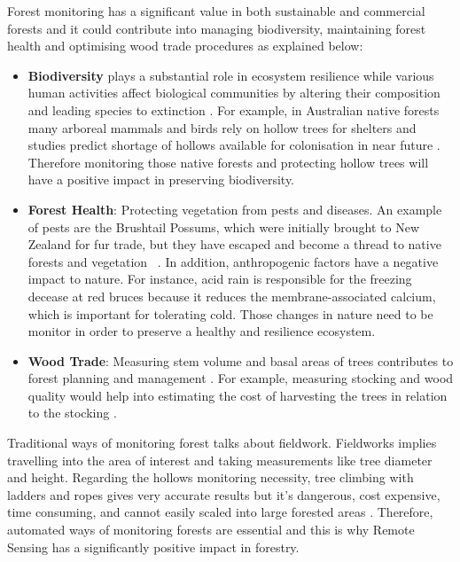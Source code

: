 \documentclass{subfiles}
\begin{document}
Forest monitoring has a significant value in both sustainable and commercial forests and it could contribute into managing biodiversity, maintaining forest health and optimising wood trade procedures as explained below: 
\begin{itemize}
 \item \textbf{Biodiversity} plays a substantial role in ecosystem resilience \cite{Elmqvist2003} while various human activities affect biological communities by altering their composition and leading species to extinction \cite{Hooper2005}.  For example, in Australian native forests many arboreal mammals and birds rely on hollow trees for shelters \cite{Lindenmayer2010} and studies predict shortage of hollows available for colonisation in near future \cite{Goldingay2009}\cite{Gibbons2002}. Therefore monitoring those native forests and protecting hollow trees will have a positive impact in preserving biodiversity.
 \item \textbf{Forest Health}: Protecting vegetation from pests and diseases. An example of pests are the Brushtail Possums, which were initially brought to New Zealand for fur trade, but they have escaped and become a thread to native forests and vegetation ~\cite{DepartementOfConversation2014}. In addition, anthropogenic factors have a negative impact to nature. For instance, acid rain is responsible for the freezing decease at red bruces because it reduces the membrane-associated calcium, which is important for tolerating cold\cite{DeHayes1999}. Those changes in nature need to be monitor in order to preserve a healthy and resilience ecosystem. 

 
 \item \textbf{Wood Trade}:  Measuring stem volume and basal areas of trees contributes to forest planning and management \cite{Holmgren2004}. For example, measuring stocking and wood quality would help into estimating the cost of harvesting the trees in relation to the stocking \cite{Susana2015}.
 
\end{itemize}
 
Traditional ways of monitoring forest talks about fieldwork. Fieldworks implies travelling into the area of interest and taking measurements like tree diameter and height. Regarding the hollows monitoring necessity, tree climbing with ladders and ropes gives very accurate results but it's dangerous, cost expensive, time consuming, and cannot easily scaled into large forested areas \cite{Harper2004}\cite{Rayner2011}. Therefore, automated ways of monitoring forests are essential and this is why Remote Sensing has a significantly positive impact in forestry. 
 
\end{document}
